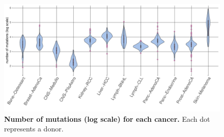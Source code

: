 \begin{figure}[h!]
    \centering
    \includegraphics[scale=0.6]{graphics/mutation_summary.pdf}
    \caption{\textbf{Number of mutations (log scale) for each cancer.} Each dot represents a donor.}
    \label{fig:mutation_summary}
\end{figure}
